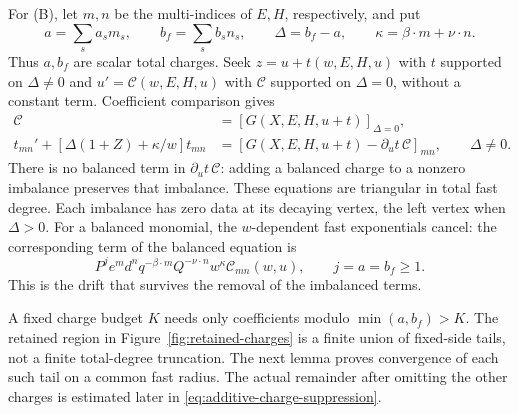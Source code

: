 For (B), let $m,n$ be the multi-indices of $E,H$, respectively, and put
\begin{equation}\label{eq:additive-charges}
 a=\sum_s a_sm_s,\qquad b_f=\sum_s b_sn_s,\qquad
 \Delta=b_f-a,\qquad \kappa=\beta\cdot m+\nu\cdot n.
\end{equation}
Thus $a,b_f$ are scalar total charges.  Seek
$z=u+t(w,E,H,u)$ with $t$ supported on $\Delta\ne0$ and
$u'=\mathcal C(w,E,H,u)$ with $\mathcal C$ supported on
$\Delta=0$, without a constant term.  Coefficient comparison gives
\begin{align}
 \mathcal C&=[G(X,E,H,u+t)]_{\Delta=0},\label{eq:additive-balanced}\\
 t_{mn}'+[\Delta(1+Z)+\kappa/w]t_{mn}
   &=[G(X,E,H,u+t)-\partial_ut\,\mathcal C]_{mn},
           \qquad\Delta\ne0.\label{eq:additive-imbalance}
\end{align}
There is no balanced term in $\partial_ut\,\mathcal C$: adding a
balanced charge to a nonzero imbalance preserves that imbalance.
These equations are triangular in total fast degree.  Each imbalance
has zero data at its decaying vertex, the left vertex when $\Delta>0$.
For a balanced monomial, the $w$-dependent fast exponentials cancel:
the corresponding term of the balanced equation is
\begin{equation}\label{eq:additive-balanced-P}
 P^j e^md^n q^{-\beta\cdot m}Q^{-\nu\cdot n}
          w^{\kappa}\mathcal C_{mn}(w,u),\qquad
 j=a=b_f\ge1.
\end{equation}
This is the drift that survives the removal of the imbalanced terms.

A fixed charge budget $K$ needs only coefficients modulo
$\min(a,b_f)>K$.  The retained region in
Figure~\ref{fig:retained-charges} is a finite union of fixed-side tails,
not a finite total-degree truncation.  The next lemma proves convergence
of each such tail on a common fast radius.  The actual remainder after
omitting the other charges is estimated later in
\eqref{eq:additive-charge-suppression}.



